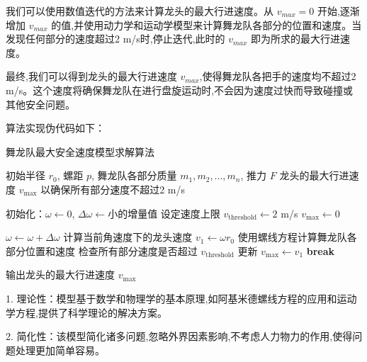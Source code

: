 我们可以使用数值迭代的方法来计算龙头的最大行进速度。从 \( v_{max} = 0 \) 开始,逐渐增加 \( v_{max} \) 的值,并使用动力学和运动学模型来计算舞龙队各部分的位置和速度。当发现任何部分的速度超过2 m/s时,停止迭代,此时的 \( v_{max} \) 即为所求的最大行进速度。


最终,我们可以得到龙头的最大行进速度 \( v_{max} \),使得舞龙队各把手的速度均不超过2 m/s。这个速度将确保舞龙队在进行盘旋运动时,不会因为速度过快而导致碰撞或其他安全问题。

算法实现伪代码如下：
\begin{breakablealgorithm}
	\caption{舞龙队最大安全速度模型求解算法}
	\begin{algorithmic}[1]
		\Require 初始半径 $r_0$, 螺距 $p$, 舞龙队各部分质量 $m_1, m_2, ..., m_n$, 推力 $F$
		\Ensure 龙头的最大行进速度 $v_{\text{max}}$ 以确保所有部分速度不超过2 m/s
		
		\State 初始化：$\omega \gets 0$, $\Delta \omega \gets \text{小的增量值}$
		\State 设定速度上限 $v_{\text{threshold}} \gets 2$ m/s
		\State $v_{\text{max}} \gets 0$
		
		\State $\omega \gets \omega + \Delta \omega$
		\State 计算当前角速度下的龙头速度 $v_1 \gets \omega r_0$
		\State 使用螺线方程计算舞龙队各部分位置和速度
		\State 检查所有部分速度是否超过 $v_{\text{threshold}}$
		\State 更新 $v_{\text{max}} \gets v_1$
		\Else
		\State \textbf{break}
		\EndIf
		\EndWhile
		
		\State 输出龙头的最大行进速度 $v_{\text{max}}$
	\end{algorithmic}
\end{breakablealgorithm}















1. 理论性：模型基于数学和物理学的基本原理,如阿基米德螺线方程的应用和运动学方程,提供了科学理论的解决方案。

2. 简化性：该模型简化诸多问题,忽略外界因素影响,不考虑人力物力的作用,使得问题处理更加简单容易。

